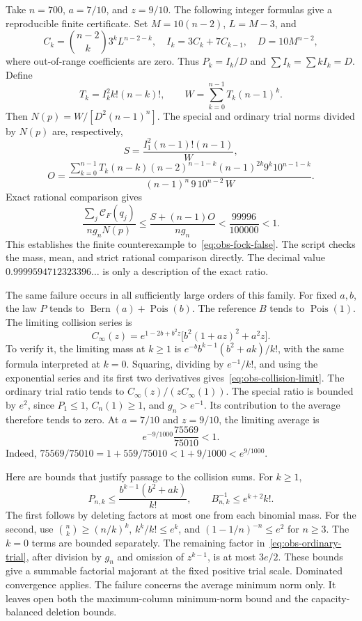 \documentclass[11pt,a4paper]{article}
\theoremstyle{definition}
\theoremstyle{remark}
\begin{document}
Take $n=700$, $a=7/10$, and $z=9/10$.
The following integer formulas give a reproducible finite certificate.
Set $M=10(n-2)$, $L=M-3$, and
\[
 C_k=\binom{n-2}{k}3^kL^{n-2-k},\quad
 I_k=3C_k+7C_{k-1},\quad D=10M^{n-2},
\]
where out-of-range coefficients are zero.
Thus $P_k=I_k/D$ and $\sum I_k=\sum kI_k=D$.
Define
\[
 T_k=I_k^2k!(n-k)!,\qquad W=\sum_{k=0}^{n-1}T_k(n-1)^k.
\]
Then $N(p)=W/[D^2(n-1)^n]$.
The special and ordinary trial norms divided by $N(p)$ are, respectively,
\[
 S=\frac{I_1^2(n-1)!(n-1)}W,
\]
\[
 O=\frac{\displaystyle\sum_{k=0}^{n-1}
 T_k(n-k)(n-2)^{n-1-k}(n-1)^{2k}9^k10^{n-1-k}}
 {(n-1)^n\,9\,10^{n-2}\,W}.
\]
Exact rational comparison gives
\begin{equation}\label{eq:obs-700}
 \frac{\sum_j\mathcal C_F(q_j)}{ng_nN(p)}
 \le\frac{S+(n-1)O}{ng_n}<\frac{99996}{100000}<1.
\end{equation}
This establishes the finite counterexample to~\eqref{eq:obs-fock-false}.
The script checks the mass, mean, and strict rational comparison directly.
The decimal value $0.9999594712323396\ldots$ is only a description of the
exact ratio.

The same failure occurs in all sufficiently large orders of this family.
For fixed $a,b$, the law $P$ tends to $\operatorname{Bern}(a)+\operatorname{Pois}(b)$.
The reference $B$ tends to $\operatorname{Pois}(1)$.
The limiting collision series is
\begin{equation}\label{eq:obs-collision-limit}
 C_\infty(z)=e^{1-2b+b^2z}\bigl[b^2(1+az)^2+a^2z\bigr].
\end{equation}
To verify it, the limiting mass at $k\ge1$ is
$e^{-b}b^{k-1}(b^2+ak)/k!$, with the same formula interpreted at $k=0$.
Squaring, dividing by $e^{-1}/k!$, and using the exponential series and
its first two derivatives gives~\eqref{eq:obs-collision-limit}.
The ordinary trial ratio tends to
$C_\infty(z)/(zC_\infty(1))$.
The special ratio is bounded by $e^2$, since $P_1\le1$,
$C_n(1)\ge1$, and $g_n>e^{-1}$.
Its contribution to the average therefore tends to zero.
At $a=7/10$ and $z=9/10$, the limiting average is
\[
 e^{-9/1000}\frac{75569}{75010}<1.
\]
Indeed, $75569/75010=1+559/75010<1+9/1000<e^{9/1000}$.

Here are bounds that justify passage to the collision sums.
For $k\ge1$,
\[
 P_{n,k}\le\frac{b^{k-1}(b^2+ak)}{k!},\qquad
 B_{n,k}^{-1}\le e^{k+2}k!.
\]
The first follows by deleting factors at most one from each binomial mass.
For the second, use
$\binom nk\ge(n/k)^k$, $k^k/k!\le e^k$, and
$(1-1/n)^{-n}\le e^2$ for $n\ge3$.
The $k=0$ terms are bounded separately.
The remaining factor in~\eqref{eq:obs-ordinary-trial}, after division by
$g_n$ and omission of $z^{k-1}$, is at most $3e/2$.
These bounds give a summable factorial majorant at the fixed positive
trial scale. Dominated convergence applies.
The failure concerns the average minimum norm only.
It leaves open both the maximum-column minimum-norm bound and the
capacity-balanced deletion bounds.
\end{document}
